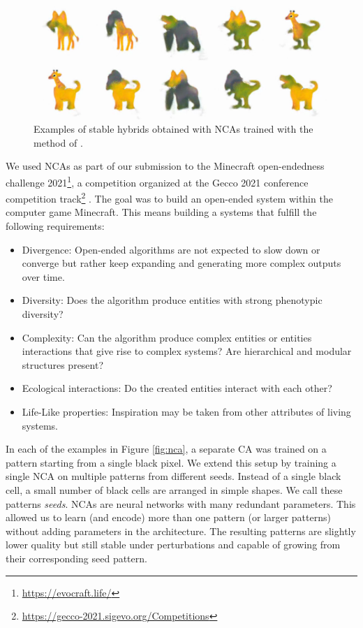 \begin{figure}[htbp]
  \centering
  \includegraphics[width=.8\linewidth]{figures/nca_hybrids.png}
  \caption{Examples of stable hybrids obtained with \acp{NCA} trained with the
    method of \parencite{cisnerosOpenendedCreationHybrid2021}.}
  \label{fig:nca_hybrid}
\end{figure}


We used \acp{NCA} as part of our submission to the Minecraft open-endedness
challenge 2021\footnote{\url{https://evocraft.life/}}, a competition organized
at the Gecco 2021 conference competition
track\footnote{\url{https://gecco-2021.sigevo.org/Competitions}}
\parencite{cisnerosOpenendedCreationHybrid2021}. The goal was to build an
open-ended system within the computer game Minecraft. This means building a
systems that fulfill the following requirements:

\begin{itemize}
  \item Divergence: Open-ended algorithms are not expected to slow down or
        converge but rather keep expanding and generating more complex outputs
        over time.

  \item Diversity: Does the algorithm produce entities with strong phenotypic
        diversity?

  \item Complexity: Can the algorithm produce complex entities or entities
        interactions that give rise to complex systems? Are hierarchical and
        modular structures present?

  \item Ecological interactions: Do the created entities interact with each
        other?

  \item Life-Like properties: Inspiration may be taken from other attributes of
        living systems.
\end{itemize}

In each of the examples in Figure \ref{fig:nca}, a separate \ac{CA} was trained
on a pattern starting from a single black pixel. We extend this setup by
training a single \ac{NCA} on multiple patterns from different seeds. Instead of
a single black cell, a small number of black cells are arranged in simple
shapes. We call these patterns \emph{seeds}. \acp{NCA} are neural networks with many redundant parameters. This allowed us to learn (and encode) more than one
pattern (or larger patterns) without adding parameters in the architecture. The
resulting patterns are slightly lower quality but still stable under
perturbations and capable of growing from their corresponding seed pattern.

